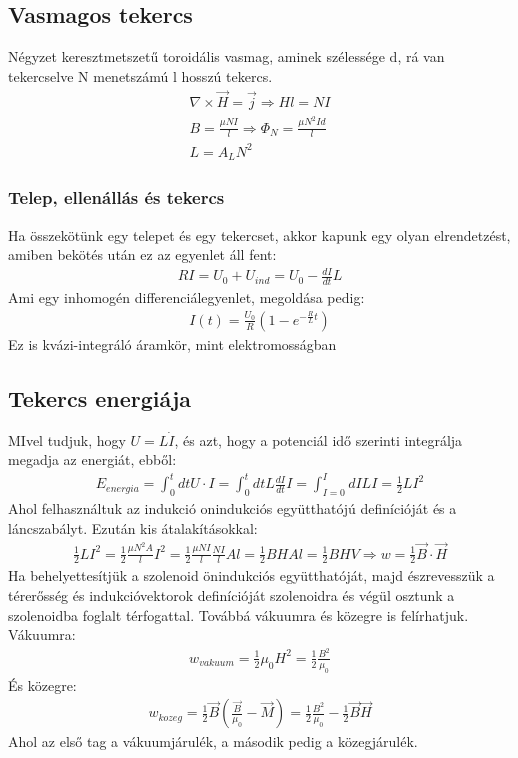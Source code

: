\documentclass{article}
\begin{document}
\subsection{Vasmagos tekercs}
Négyzet keresztmetszetű toroidális vasmag, aminek szélessége d, rá van tekercselve N menetszámú l hosszú tekercs. 
\begin{gather*}
\nabla \times \vec{H} = \vec{j} \Rightarrow Hl=NI \\
B=\frac{\mu N I}{l} \Rightarrow \Phi_N = \frac{\mu N^2 I d}{l} \\
L=A_L N^2
\end{gather*}
\subsubsection{Telep, ellenállás és tekercs}
Ha összekötünk egy telepet és egy tekercset, akkor kapunk egy olyan elrendetzést, amiben bekötés után ez az egyenlet áll fent:
\begin{gather*}
RI=U_0+U_{ind} = U_0-\frac{dI}{dt}L
\end{gather*} 
Ami egy inhomogén differenciálegyenlet, megoldása pedig:
\begin{gather*}
I(t) = \frac{U_0}{R} \left( 1-e^{-\frac{R}{L}t} \right)
\end{gather*}
Ez is kvázi-integráló áramkör, mint elektromosságban
\subsection{Tekercs energiája}
MIvel tudjuk, hogy $U=L\dot{I}$, és azt, hogy a potenciál idő szerinti integrálja megadja az energiát, ebből:
\begin{gather*}
E_{energia} = \int_{0}^t dt U\cdot I = \int_0^t dt L \frac{dI}{dt} I = \int_{I=0}^{I} dI LI = \frac{1}{2} LI^2
\end{gather*}
Ahol felhasználtuk az indukció onindukciós együtthatójú definícióját és a láncszabályt. Ezután kis átalakításokkal:
\begin{gather*}
\frac{1}{2}LI^2 = \frac{1}{2} \frac{\mu N^2 A}{l} I^2 = \frac{1}{2} \frac{\mu N I }{l} \frac{N I }{l} A l = \frac{1}{2} BHAl = \frac{1}{2}BHV \Rightarrow w = \frac{1}{2} \vec{B} \cdot \vec{H}
\end{gather*}
Ha behelyettesítjük a szolenoid önindukciós együtthatóját, majd észrevesszük a térerősség és indukcióvektorok definícióját szolenoidra és végül osztunk a szolenoidba foglalt térfogattal. Továbbá vákuumra és közegre is felírhatjuk. Vákuumra:
\begin{gather*}
w_{vakuum}=\frac{1}{2}\mu_0 H^2 = \frac{1}{2} \frac{B^2}{\mu_0}
\end{gather*}
És közegre:
\begin{gather*}
w_{kozeg}=\frac{1}{2} \vec{B} \left( \frac{\vec{B}}{\mu_0} - \vec{M}\right) = \frac{1}{2} \frac{B^2}{\mu_0} - \frac{1}{2} \vec{B} \vec{H}
\end{gather*}
Ahol az első tag a vákuumjárulék, a második pedig a közegjárulék.
\end{document}
